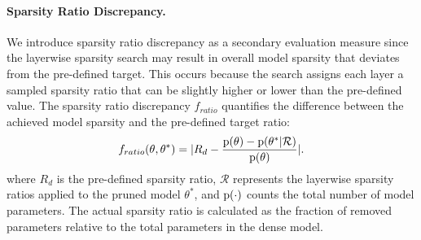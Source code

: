 \paragraph{Sparsity Ratio Discrepancy.}
We introduce sparsity ratio discrepancy as a secondary evaluation measure since the layerwise sparsity search may result in overall model sparsity that deviates from the pre-defined target. This occurs because the search assigns each layer a sampled sparsity ratio that can be slightly higher or lower than the pre-defined value. The sparsity ratio discrepancy $f_{ratio}$ quantifies the difference between the achieved model sparsity and the pre-defined target ratio: 
\begin{equation}
    f_{ratio} (\theta, \theta^{*}) = |R_{d} - \frac{\rm{p}(\theta) - \rm{p}(\theta^{*}|\mathcal{R})}{\rm{p}(\theta)}|.
    \label{eq:ratio}
\end{equation}
where $R_{d}$ is the pre-defined sparsity ratio, $\mathcal{R}$ represents the layerwise sparsity ratios applied to the pruned model $\theta^*$, and $\rm{p}(\cdot)$ counts the total number of model parameters. The actual sparsity ratio is calculated as the fraction of removed parameters relative to the total parameters in the dense model.


